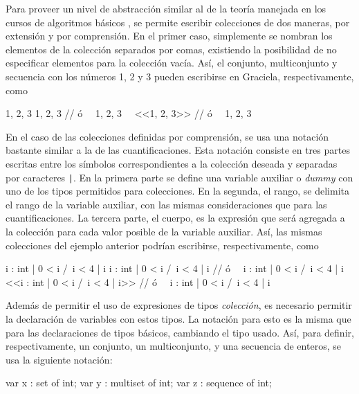 Para proveer un nivel de abstracción similar al de la teoría manejada en los
cursos de algoritmos básicos , se permite escribir
colecciones de dos maneras, por extensión y por comprensión. En el primer caso,
simplemente se nombran los elementos de la colección separados por comas,
existiendo la posibilidad de no especificar elementos para la colección vacía.
Así, el conjunto, multiconjunto y secuencia con los números 1, 2 y 3 pueden
escribirse en Graciela, respectivamente, como

\begin{gracielacode}
   {1, 2, 3}
  {{1, 2, 3}} // ó ~\Lbag~1, 2, 3~\Rbag~
  <<1, 2, 3>> // ó ~\Lseq~1, 2, 3~\Rseq~
\end{gracielacode}

En el caso de las colecciones definidas por comprensión, se usa una notación
bastante similar a la de las cuantificaciones. Esta notación consiste en tres
partes escritas entre los símbolos correspondientes a la colección deseada y
separadas por caracteres \texttt{|}. En la primera parte se define una variable
auxiliar o \textit{dummy} con uno de los tipos permitidos para colecciones. En
la segunda, el rango, se delimita el rango de la variable auxiliar, con las
mismas consideraciones que para las cuantificaciones. La tercera parte, el
cuerpo, es la expresión que será agregada a la colección para cada valor posible
de la variable auxiliar. Así, las mismas colecciones del ejemplo anterior
podrían escribirse, respectivamente, como

\begin{gracielacode}
   {i : int | 0 < i /\ i < 4 | i}
  {{i : int | 0 < i /\ i < 4 | i}} // ó ~\Lbag~i : int | 0 < i /\ i < 4 | i~\Rbag~
  <<i : int | 0 < i /\ i < 4 | i>> // ó ~\Lseq~i : int | 0 < i /\ i < 4 | i~\Rseq~
\end{gracielacode}

Además de permitir el uso de expresiones de tipos \textit{colección}, es
necesario permitir la declaración de variables con estos tipos. La notación para
esto es la misma que para las declaraciones de tipos básicos, cambiando el tipo
usado. Así, para definir, respectivamente, un conjunto, un multiconjunto, y una
secuencia de enteros, se usa la siguiente notación:

\begin{gracielacode}
  var x : set of int;
  var y : multiset of int;
  var z : sequence of int;
\end{gracielacode}

